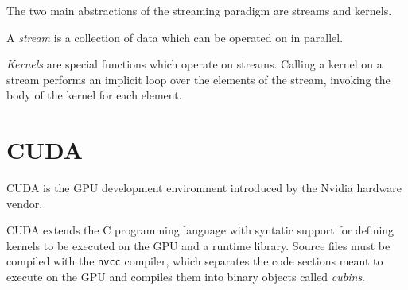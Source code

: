 The two main abstractions of the streaming paradigm are streams and kernels.

A \emph{stream} is a collection of data which can be operated on in parallel.

\emph{Kernels} are special functions which operate on streams.
Calling a kernel on a stream
performs an implicit loop over the elements of the stream,
invoking the body of the kernel for each element.


\section{CUDA}

CUDA is the GPU development environment
introduced by the Nvidia hardware vendor.

CUDA extends the C programming language
with syntatic support for defining kernels
to be executed on the GPU
and a runtime library.
Source files must be compiled with the \texttt{nvcc} compiler,
which separates the code sections meant to execute on the GPU
and compiles them into binary objects called \emph{cubins}.

